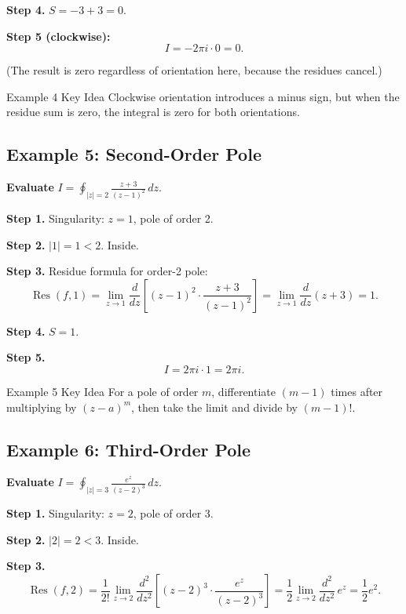 \documentclass[12pt,a4paper]{article}
\begin{document}
\textbf{Step 4.} $S = -3 + 3 = 0$.

\textbf{Step 5 (clockwise):}
\[
  I = -2\pi i \cdot 0 = \boxed{0}.
\]

(The result is zero regardless of orientation here, because the residues cancel.)

\begin{learnbox}{Example 4 Key Idea}
Clockwise orientation introduces a minus sign, but when the residue sum is zero,
the integral is zero for both orientations.
\end{learnbox}

\subsection*{Example 5: Second-Order Pole}

\textbf{Evaluate} $\displaystyle I = \oint_{|z|=2}
  \frac{z+3}{(z-1)^2}\,dz$.

\textbf{Step 1.} Singularity: $z=1$, pole of order 2.

\textbf{Step 2.} $|1|=1<2$. Inside.

\textbf{Step 3.} Residue formula for order-2 pole:
\[
  \operatorname{Res}(f,1)
  = \lim_{z\to 1}\frac{d}{dz}\!\left[(z-1)^2 \cdot \frac{z+3}{(z-1)^2}\right]
  = \lim_{z\to 1}\frac{d}{dz}(z+3)
  = 1.
\]

\textbf{Step 4.} $S=1$.

\textbf{Step 5.}
\[
  I = 2\pi i \cdot 1 = \boxed{2\pi i}.
\]

\begin{learnbox}{Example 5 Key Idea}
For a pole of order $m$, differentiate $(m-1)$ times after multiplying by
$(z-a)^m$, then take the limit and divide by $(m-1)!$.
\end{learnbox}

\subsection*{Example 6: Third-Order Pole}

\textbf{Evaluate} $\displaystyle I = \oint_{|z|=3}
  \frac{e^z}{(z-2)^3}\,dz$.

\textbf{Step 1.} Singularity: $z=2$, pole of order 3.

\textbf{Step 2.} $|2|=2<3$. Inside.

\textbf{Step 3.}
\[
  \operatorname{Res}(f,2)
  = \frac{1}{2!}\lim_{z\to 2}\frac{d^2}{dz^2}\!\left[(z-2)^3\cdot\frac{e^z}{(z-2)^3}\right]
  = \frac{1}{2}\lim_{z\to 2}\frac{d^2}{dz^2}\,e^z
  = \frac{1}{2}e^2.
\]
\end{document}

